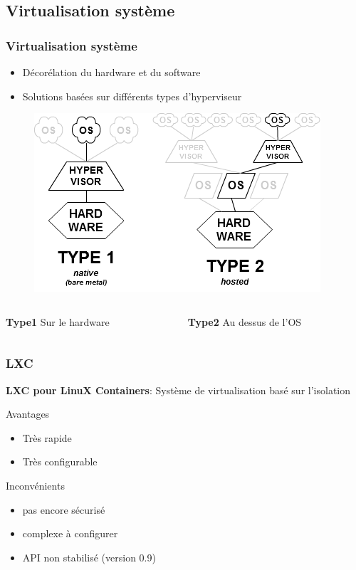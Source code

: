 \documentclass{beamer}
\begin{document}
		\subsection{Virtualisation système}
			\begin{frame}
			  \frametitle{Virtualisation système}
			  \begin{itemize}
   			  \item Décorélation du hardware et du software
			    \item Solutions basées sur différents types d'hyperviseur
			  \end{itemize}
        \begin{figure}
			    \includegraphics[scale=0.5]{img/Hyperviseur.png}
 			  \end{figure}
 			  \begin{columns}
          \begin{column}{.48\textwidth}
			      \textbf{Type1} Sur le hardware
			    \end{column}
          \hfill
          \begin{column}{.48\textwidth}
            \textbf{Type2} Au dessus de l'OS
          \end{column}
        \end{columns}
			\end{frame}
			
			\begin{frame}
				\frametitle{LXC}
				\textbf{LXC pour LinuX Containers}: Système de virtualisation basé sur l'isolation
				\begin{exampleblock}{Avantages}
				  \begin{itemize}
				    \item Très rapide
				    \item Très configurable
				  \end{itemize}
				\end{exampleblock}
				\begin{alertblock}{Inconvénients}
				  \begin{itemize}
				    \item pas encore sécurisé
				    \item complexe à configurer
				    \item API non stabilisé (version 0.9)
				  \end{itemize}
				\end{alertblock}
			\end{frame}
	
\end{document}
